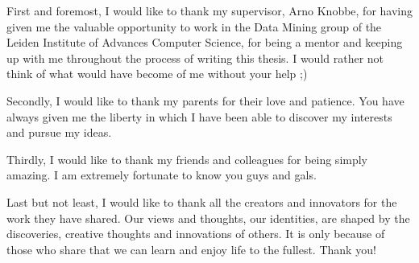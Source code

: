 First and foremost, I would like to thank my supervisor, Arno Knobbe, for having given me the valuable opportunity to work in the Data Mining group of the Leiden Institute of Advances Computer Science, for being a mentor and keeping up with me throughout the process of writing this thesis.
I would rather not think of what would have become of me without your help ;)

Secondly, I would like to thank my parents for their love and patience.
You have always given me the liberty in which I have been able to discover my interests and pursue my ideas.

Thirdly, I would like to thank my friends and colleagues for being simply amazing.
I am extremely fortunate to know you guys and gals.

Last but not least, I would like to thank all the creators and innovators for the work they have shared.
Our views and thoughts, our identities, are shaped by the discoveries, creative thoughts and innovations of others.
It is only because of those who share that we can learn and enjoy life to the fullest.
Thank you!